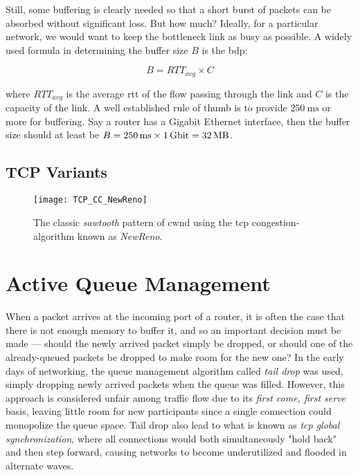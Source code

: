 Still, some buffering is clearly needed so that a short burst of packets can be absorbed without significant loss. But how much? Ideally, for a particular network, we would want to keep the bottleneck link as busy as possible. A widely used formula in determining the buffer size $B$ is the \gls{bdp}:

\begin{equation}
    B = RTT_{avg} \times C
\end{equation}

where $RTT_{avg}$ is the average \gls{rtt} of the flow passing through the link and $C$ is the capacity of the link. A well established rule of thumb is to provide $\SI{250}{\milli\second}$ or more  for buffering. \cite{sizing_router_buffers} Say a router has a Gigabit Ethernet interface, then the buffer size should at least be $B = \SI{250}{\milli\second} \times \SI{1}{\giga\bit} = \SI{32}{\mega\byte}$.




\subsection{TCP Variants}


\begin{figure}[H]
    \centering
    \texttt{[image: TCP\_CC\_NewReno]}
    \captionsetup{width=0.6\textwidth}
    \caption{The classic \textit{sawtooth} pattern of \gls{cwnd} using the \gls{tcp} congestion-algorithm known as \textit{NewReno}. }
\end{figure}








\section{Active Queue Management}

When a packet arrives at the incoming port of a router, it is often the case that there is not enough memory to buffer it, and so an important decision must be made --- should the newly arrived packet simply be dropped, or should one of the already-queued packets be dropped to make room for the new one? In the early days of networking, the queue management algorithm called \textit{tail drop} was used, simply dropping newly arrived packets when the queue was filled. However, this approach is considered unfair among traffic flow due to its \textit{first come, first serve} basis, leaving little room for new participants since a single connection could monopolize the queue space. \cite{on_traffic_phase_effects_in_packet_switched_gateways} Tail drop also lead to what is known as \textit{\gls{tcp} global synchronization}, where all connections would both simultaneously "hold back" and then step forward, causing networks to become underutilized and flooded in alternate waves.

